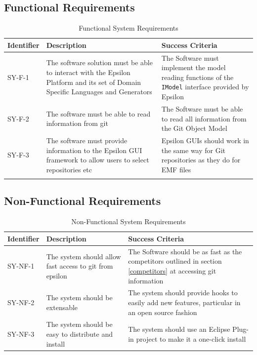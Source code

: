\documentclass[11pt]{book}
\newcommand{\code}[1]{\texttt{#1}}
\begin{document}
\subsection{Functional Requirements}
\begin{longtable}{|p{2cm}|p{7cm}|p{6cm}|}
\hline
\textbf{Identifier} & \textbf{Description} & \textbf{Success Criteria} \\ \hline
SY-F-1 & The software solution must be able to interact with the Epsilon Platform and its set of Domain Specific Languages and Generators & The Software must implement the model reading functions of the \code{IModel} interface provided by Epsilon \\ \hline
SY-F-2 & The software must be able to read information from git & The Software must be able to read all information from the Git Object Model \\ \hline
SY-F-3 & The software must provide information to the Epsilon GUI framework to allow users to select repositories etc & Epsilon GUIs should work in the same way for Git repositories as they do for EMF files \\ \hline
\caption{Functional System Requirements}
\label{tab:functionalsystemrequirements}
\end{longtable}


\subsection{Non-Functional Requirements}
\begin{table}[H]
\centering
\begin{longtable}{|p{2cm}|p{7cm}|p{6cm}|}
\hline
\textbf{Identifier} & \textbf{Description} & \textbf{Success Criteria} \\ \hline
SY-NF-1 & The system should allow fast access to git from epsilon & The Software should be as fast as the competitors outlined in section \ref{competitors} at accessing git information \\ \hline
SY-NF-2 & The system should be extensable & The system should provide hooks to easily add new features, particular in an open source fashion \\ \hline
SY-NF-3 & The system should be easy to distribute and install & The system should use an Eclipse Plug-in project to make it a one-click install \\ \hline
\end{longtable}
\caption{Non-Functional System Requirements}
\label{tab:nonfunctionalsystemrequirements}
\end{table}
\end{document}
